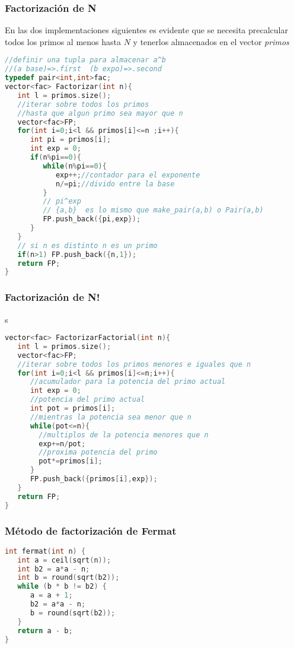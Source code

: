 \subsubsection{Factorización de N}
En las dos implementaciones siguientes es evidente que se necesita precalcular todos los primos al menos hasta $N$ y tenerlos almacenados en el vector \emph{primos}

\begin{lstlisting}[language=C++]
//definir una tupla para almacenar a^b 
//(a base)=>.first  (b expo)=>.second
typedef pair<int,int>fac;
vector<fac> Factorizar(int n){
   int l = primos.size();
   //iterar sobre todos los primos
   //hasta que algun primo sea mayor que n
   vector<fac>FP;
   for(int i=0;i<l && primos[i]<=n ;i++){
      int pi = primos[i];
      int exp = 0;
      if(n%pi==0){
         while(n%pi==0){
            exp++;//contador para el exponente
            n/=pi;//divido entre la base
         }
         // pi^exp
	     // {a,b}  es lo mismo que make_pair(a,b) o Pair(a,b)
         FP.push_back({pi,exp});
	  }
   }
   // si n es distinto n es un primo
   if(n>1) FP.push_back({n,1});
   return FP;
}
\end{lstlisting}

\subsubsection{Factorización de N!}s
\begin{lstlisting}[language=C++]
vector<fac> FactorizarFactorial(int n){
   int l = primos.size();
   vector<fac>FP;
   //iterar sobre todos los primos menores e iguales que n
   for(int i=0;i<l && primos[i]<=n;i++){
      //acumulador para la potencia del primo actual
      int exp = 0;
      //potencia del primo actual
      int pot = primos[i];
      //mientras la potencia sea menor que n
      while(pot<=n){
        //multiplos de la potencia menores que n
        exp+=n/pot;
        //proxima potencia del primo
        pot*=primos[i];
      }
      FP.push_back({primos[i],exp});
   }
   return FP;
}
\end{lstlisting}


\subsubsection{Método de factorización de Fermat}
\begin{lstlisting}[language=C++]
int fermat(int n) {
   int a = ceil(sqrt(n));
   int b2 = a*a - n;
   int b = round(sqrt(b2));
   while (b * b != b2) {
      a = a + 1;
      b2 = a*a - n;
      b = round(sqrt(b2));
   }
   return a - b;
}

\end{lstlisting} 


